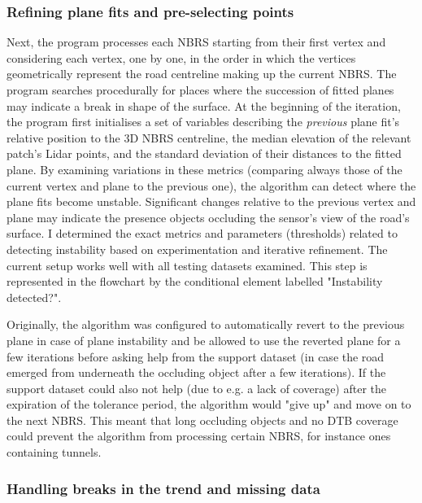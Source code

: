 \subsubsection{Refining plane fits and pre-selecting points}

Next, the program processes each NBRS starting from their first vertex and considering each vertex, one by one, in the order in which the vertices geometrically represent the road centreline making up the current NBRS. The program searches procedurally for places where the succession of fitted planes may indicate a break in shape of the surface. At the beginning of the iteration, the program first initialises a set of variables describing the \textit{previous} plane fit's relative position to the 3D NBRS centreline, the median elevation of the relevant patch's Lidar points, and the standard deviation of their distances to the fitted plane. By examining variations in these metrics (comparing always those of the current vertex and plane to the previous one), the algorithm can detect where the plane fits become unstable. Significant changes relative to the previous vertex and plane may indicate the presence objects occluding the sensor's view of the road's surface. I determined the exact metrics and parameters (thresholds) related to detecting instability based on experimentation and iterative refinement. The current setup works well with all testing datasets examined. This step is represented in the flowchart by the conditional element labelled "Instability detected?".

Originally, the algorithm was configured to automatically revert to the previous plane in case of plane instability and be allowed to use the reverted plane for a few iterations before asking help from the support dataset (in case the road emerged from underneath the occluding object after a few iterations). If the support dataset could also not help (due to e.g. a lack of coverage) after the expiration of the tolerance period, the algorithm would "give up" and move on to the next NBRS. This meant that long occluding objects and no DTB coverage could prevent the algorithm from processing certain NBRS, for instance ones containing tunnels.

\subsubsection{Handling breaks in the trend and missing data}

